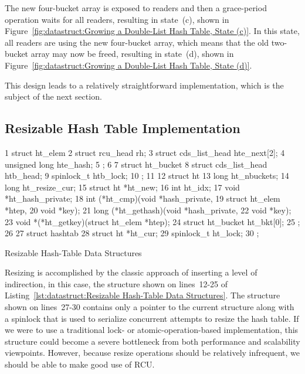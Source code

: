 The new four-bucket array is exposed to readers and then a grace-period
operation waits for all readers, resulting in state~(c), shown in
Figure~\ref{fig:datastruct:Growing a Double-List Hash Table, State (c)}.
In this state, all readers are using the new four-bucket array,
which means that the old two-bucket array may now be freed, resulting
in state~(d), shown in
Figure~\ref{fig:datastruct:Growing a Double-List Hash Table, State (d)}.

This design leads to a relatively straightforward implementation,
which is the subject of the next section.

\subsection{Resizable Hash Table Implementation}
\label{sec:datastruct:Resizable Hash Table Implementation}

\begin{listing}[tb]
{ \scriptsize
\begin{verbbox}
 1 struct ht_elem {
 2   struct rcu_head rh;
 3   struct cds_list_head hte_next[2];
 4   unsigned long hte_hash;
 5 };
 6 
 7 struct ht_bucket {
 8   struct cds_list_head htb_head;
 9   spinlock_t htb_lock;
10 };
11 
12 struct ht {
13   long ht_nbuckets;
14   long ht_resize_cur;
15   struct ht *ht_new;
16   int ht_idx;
17   void *ht_hash_private;
18   int (*ht_cmp)(void *hash_private,
19                 struct ht_elem *htep,
20                 void *key);
21   long (*ht_gethash)(void *hash_private,
22                      void *key);
23   void *(*ht_getkey)(struct ht_elem *htep);
24   struct ht_bucket ht_bkt[0];
25 };
26 
27 struct hashtab {
28   struct ht *ht_cur;
29   spinlock_t ht_lock;
30 };
\end{verbbox}
}
\centering
\theverbbox
\caption{Resizable Hash-Table Data Structures}
\label{lst:datastruct:Resizable Hash-Table Data Structures}
\end{listing}

Resizing is accomplished by the classic approach of inserting a level
of indirection, in this case, the  structure shown on
lines~12-25 of
Listing~\ref{lst:datastruct:Resizable Hash-Table Data Structures}.
The  structure shown on lines~27-30 contains only a
pointer to the current  structure along with a spinlock that
is used to serialize concurrent attempts to resize the hash table.
If we were to use a traditional lock- or atomic-operation-based
implementation, this  structure could become a severe bottleneck
from both performance and scalability viewpoints.
However, because resize operations should be relatively infrequent,
we should be able to make good use of RCU.

